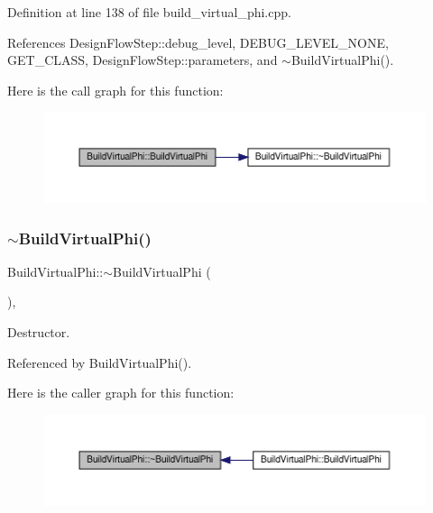 Definition at line 138 of file build\+\_\+virtual\+\_\+phi.\+cpp.



References Design\+Flow\+Step\+::debug\+\_\+level, D\+E\+B\+U\+G\+\_\+\+L\+E\+V\+E\+L\+\_\+\+N\+O\+NE, G\+E\+T\+\_\+\+C\+L\+A\+SS, Design\+Flow\+Step\+::parameters, and $\sim$\+Build\+Virtual\+Phi().

Here is the call graph for this function\+:
\nopagebreak
\begin{figure}[H]
\begin{center}
\leavevmode
\includegraphics[width=350pt]{d8/d9b/classBuildVirtualPhi_addcc5010c282ca193036dcbb711a4c70_cgraph}
\end{center}
\end{figure}
\mbox{\label{classBuildVirtualPhi_a76f90cdfd869e945b2a4ee883c02fc2d}} 
\subsubsection{\texorpdfstring{$\sim$\+Build\+Virtual\+Phi()}{~BuildVirtualPhi()}}
{\footnotesize\ttfamily Build\+Virtual\+Phi\+::$\sim$\+Build\+Virtual\+Phi (\begin{DoxyParamCaption}{ }\end{DoxyParamCaption})\hspace{0.3cm}{\ttfamily [override]}, {\ttfamily [default]}}



Destructor. 



Referenced by Build\+Virtual\+Phi().

Here is the caller graph for this function\+:
\nopagebreak
\begin{figure}[H]
\begin{center}
\leavevmode
\includegraphics[width=350pt]{d8/d9b/classBuildVirtualPhi_a76f90cdfd869e945b2a4ee883c02fc2d_icgraph}
\end{center}
\end{figure}


